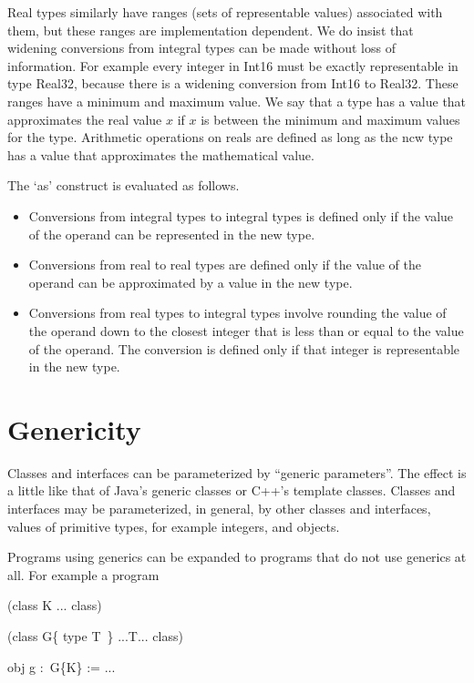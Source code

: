 \documentclass{article}%
\begin{document}
Real types similarly have ranges (sets of representable values) associated
with them, but these ranges are implementation dependent. We do insist that
widening conversions from integral types can be made without loss of
information. For example every integer in Int16 must be exactly representable
in type Real32, because there is a widening conversion from Int16 to Real32.
These ranges have a minimum and maximum value. We say that a type has a value
that approximates the real value $x$ if $x$ is between the minimum and maximum
values for the type. Arithmetic operations on reals are defined as long as the
ncw type has a value that approximates the mathematical value.

The `as' construct is evaluated as follows.

\begin{itemize}
\item Conversions from integral types to integral types is defined only if the
value of the operand can be represented in the new type.

\item Conversions from real to real types are defined only if the value of the
operand can be approximated by a value in the new type.

\item Conversions from real types to integral types involve rounding the value
of the operand down to the closest integer that is less than or equal to the
value of the operand. The conversion is defined only if that integer is
representable in the new type.
\end{itemize}

\section{Genericity}

Classes and interfaces can be parameterized by \textquotedblleft generic
parameters\textquotedblright. The effect is a little like that of Java's
generic classes or C++'s template classes. Classes and interfaces may be
parameterized, in general, by other classes and interfaces, values of
primitive types, for example integers, and objects.

Programs using generics can be expanded to programs that do not use generics
at all. For example a program

\begin{code}
(class K ... class)

(class G\{ type T\ \} ...T... class)

obj g :\ G\{K\} := ...
\end{code}
\end{document}
